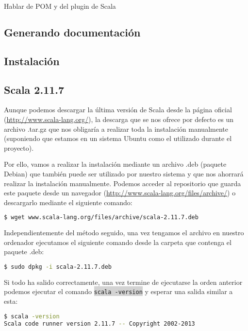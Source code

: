 Hablar de POM y del plugin de Scala

\subsection{Generando documentación}\label{subsec:documentacion}

\subsection{Instalación}

\subsection{Scala 2.11.7}
Aunque podemos descargar la última versión de Scala desde la página oficial (\url{http://www.scala-lang.org/}), la descarga que se nos ofrece por defecto es un archivo .tar.gz que nos obligaría a realizar toda la instalación manualmente (suponiendo que estamos en un sistema Ubuntu como el utilizado durante el proyecto).

Por ello, vamos a realizar la instalación mediante un archivo .deb (paquete Debian) que también puede ser utilizado por nuestro sistema y que nos ahorrará realizar la instalación manualmente. Podemos acceder al repositorio que guarda este paquete desde un navegador (\url{http://www.scala-lang.org/files/archive/}) o descargarlo mediante el siguiente comando:

\begin{lstlisting}[language=bash]
$ wget www.scala-lang.org/files/archive/scala-2.11.7.deb
\end{lstlisting}

Independientemente del método seguido, una vez tengamos el archivo en nuestro ordenador ejecutamos el siguiente comando desde la carpeta que contenga el paquete .deb:

\begin{lstlisting}[language=bash]
$ sudo dpkg -i scala-2.11.7.deb
\end{lstlisting}

Si todo ha salido correctamente, una vez termine de ejecutarse la orden anterior podemos ejecutar el comando \colorbox{lightgray}{\lstinline|scala -version|} y esperar una salida similar a esta:

\begin{lstlisting}[language=bash]
$ scala -version
Scala code runner version 2.11.7 -- Copyright 2002-2013
\end{lstlisting}

